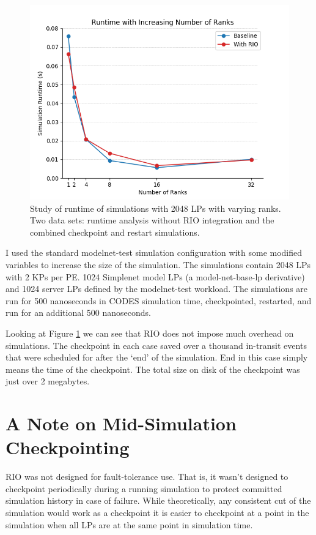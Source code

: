 \documentclass[letterpaper, 11 pt, conference]{IEEEtran}
\begin{document}
\begin{figure}[b] 
	\centering
	\includegraphics[scale=.6]{runtime}
	\caption{Study of runtime of simulations with 2048 LPs with varying ranks. Two data sets: runtime analysis without RIO integration and the combined checkpoint and restart simulations.} \label{fig:runtime}
\end{figure}

I used the standard modelnet-test simulation configuration with some modified variables to increase the size of the simulation. The simulations contain 2048 LPs with 2 KPs per PE. 1024 Simplenet model LPs (a model-net-base-lp derivative) and 1024 server LPs defined by the modelnet-test workload. The simulations are run for 500 nanoseconds in CODES simulation time, checkpointed, restarted, and run for an additional 500 nanoseconds.



Looking at Figure \ref{fig:runtime} we can see that RIO does not impose much overhead on simulations. The checkpoint in each case saved over a thousand in-transit events that were scheduled for after the `end' of the simulation. End in this case simply means the time of the checkpoint. The total size on disk of the checkpoint was just over 2 megabytes.


\section{A Note on Mid-Simulation Checkpointing} \label{sec:challenge}
RIO was not designed for fault-tolerance use. That is, it wasn't designed to checkpoint periodically during a running simulation to protect committed simulation history in case of failure. While theoretically, any consistent cut of the simulation would work as a checkpoint it is easier to checkpoint at a point in the simulation when all LPs are at the same point in simulation time.
\end{document}
